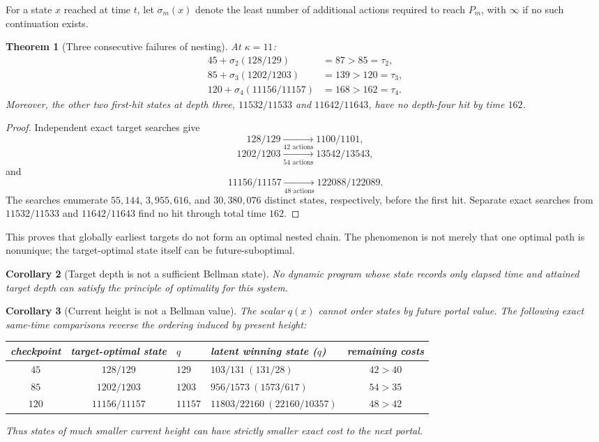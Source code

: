 \documentclass[11pt]{amsart}
\newtheorem{theorem}{Theorem}[section]
\newtheorem{corollary}[theorem]{Corollary}
\theoremstyle{definition}
\begin{document}
For a state $x$ reached at time $t$, let $\sigma_m(x)$ denote the least number of additional actions required to reach $P_m$, with $\infty$ if no such continuation exists.

\begin{theorem}[Three consecutive failures of nesting]
At $\kappa=11$:
\begin{align*}
45+\sigma_2(128/129)&=87>85=\tau_2,\\
85+\sigma_3(1202/1203)&=139>120=\tau_3,\\
120+\sigma_4(11156/11157)&=168>162=\tau_4.
\end{align*}
Moreover, the other two first-hit states at depth three, $11532/11533$ and $11642/11643$, have no depth-four hit by time $162$.
\end{theorem}

\begin{proof}
Independent exact target searches give
\[
128/129\xrightarrow[42\text{ actions}]{}1100/1101,
\]
\[
1202/1203\xrightarrow[54\text{ actions}]{}13542/13543,
\]
and
\[
11156/11157\xrightarrow[48\text{ actions}]{}122088/122089.
\]
The searches enumerate $55{,}144$, $3{,}955{,}616$, and $30{,}380{,}076$ distinct states, respectively, before the first hit.  Separate exact searches from $11532/11533$ and $11642/11643$ find no hit through total time $162$.
\end{proof}

This proves that globally earliest targets do not form an optimal nested chain.  The phenomenon is not merely that one optimal path is nonunique; the target-optimal state itself can be future-suboptimal.

\begin{corollary}[Target depth is not a sufficient Bellman state]
No dynamic program whose state records only elapsed time and attained target depth can satisfy the principle of optimality for this system.
\end{corollary}

\begin{corollary}[Current height is not a Bellman value]
The scalar $q(x)$ cannot order states by future portal value.  The following exact same-time comparisons reverse the ordering induced by present height:
\begin{center}
\small
\begin{tabular}{ccllc}
\toprule
checkpoint & target-optimal state & $q$ & latent winning state ($q$) & remaining costs\\
\midrule
$45$  & $128/129$     & $129$   & $103/131\ (131/28)$        & $42>40$\\
$85$  & $1202/1203$   & $1203$  & $956/1573\ (1573/617)$     & $54>35$\\
$120$ & $11156/11157$ & $11157$ & $11803/22160\ (22160/10357)$ & $48>42$\\
\bottomrule
\end{tabular}
\end{center}
Thus states of much smaller current height can have strictly smaller exact cost to the next portal.
\end{corollary}
\end{document}
